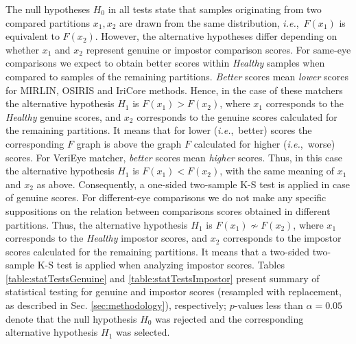 \documentclass[article,12pt]{elsarticle}
\newcommand{\ie}{{\it i.e.},~}
\begin{document}
The null hypotheses $H_0$ in all tests state that samples originating from two compared partitions $x_1, x_2$ are drawn from the same distribution, \ie $F(x_1)$ is equivalent to $F(x_2)$. However, the alternative hypotheses differ depending on whether $x_1$ and $x_2$ represent genuine or impostor comparison scores. For same-eye comparisons we expect to obtain better scores within \emph{Healthy} samples when compared to samples of the remaining partitions. \emph{Better} scores mean \emph{lower} scores for MIRLIN, OSIRIS and IriCore methods. Hence, in the case of these matchers the alternative hypothesis $H_1$ is $F(x_1) > F(x_2)$, where $x_1$ corresponds to the \emph{Healthy} genuine scores, and $x_2$ corresponds to the genuine scores calculated for the remaining partitions. It means that for lower (\ie better) scores the corresponding $F$ graph is above the graph $F$ calculated for higher (\ie worse) scores. For VeriEye matcher, \emph{better} scores mean \emph{higher} scores. Thus, in this case the alternative hypothesis $H_1$ is $F(x_1) < F(x_2)$, with the same meaning of $x_1$ and $x_2$ as above. Consequently, a one-sided two-sample K-S test is applied in case of genuine scores. For different-eye comparisons we do not make any specific suppositions on the relation between comparisons scores obtained in different partitions. Thus, the alternative hypothesis $H_1$ is $F(x_1) \nsim F(x_2)$, where $x_1$ corresponds to the \emph{Healthy} impostor scores, and $x_2$ corresponds to the impostor scores calculated for the remaining partitions. It means that a two-sided two-sample K-S test is applied when analyzing impostor scores. Tables \ref{table:statTestsGenuine} and \ref{table:statTestsImpostor} present summary of statistical testing for genuine and impostor scores (resampled with replacement, as described in Sec. \ref{sec:methodology}), respectively; $p$-values less than $\alpha=0.05$ denote that the null hypothesis $H_0$ was rejected and the corresponding alternative hypothesis $H_1$ was selected.
\end{document}
